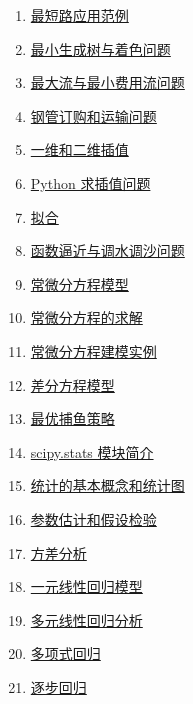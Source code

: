 \documentclass[11pt]{article}
\begin{document}
\begin{multicols}{2}
\begin{enumerate}
		\item \href{https://mp.weixin.qq.com/s/D-LwWOnp1dlR1xJcdK7jGw}{最短路应用范例}	%
		\item \href{https://mp.weixin.qq.com/s/gss20qLm8R40ghi8kswjDQ}{最小生成树与着色问题}	%
		\item \href{https://mp.weixin.qq.com/s/8_kQZ2zNd8E5o1i4J9A96g}{最大流与最小费用流问题}	%
		\item \href{https://mp.weixin.qq.com/s/4SFn62-Yr5spSnu1NDyyiw}{钢管订购和运输问题}	%
		\item \href{https://mp.weixin.qq.com/s/deuFdsP_lre19vbfrHLyuA}{一维和二维插值}	%
		\item \href{https://mp.weixin.qq.com/s/qr8_ELPp0CPPxQWQ1yDPcg}{Python 求插值问题}	%
		\item \href{https://mp.weixin.qq.com/s/W9iIVoX102xHHCMcYOHL-Q}{拟合}	%
		\item \href{https://mp.weixin.qq.com/s/kHHkfuYuxODWHGemBIlvlA}{函数逼近与调水调沙问题}	%
		\item \href{https://mp.weixin.qq.com/s/sp51TLQai2KqTYrb3awcVg}{常微分方程模型}	%
		\item \href{https://mp.weixin.qq.com/s/7K4-Oz19fJf0OOFyCTmTow}{常微分方程的求解}	%
		\item \href{https://mp.weixin.qq.com/s/6-KVS8nNr8kdSDCJK4RXCw}{常微分方程建模实例}	%
		\item \href{https://mp.weixin.qq.com/s/187nbFDvdoHGZP-_5tDMoQ}{差分方程模型}	%
		\item \href{https://mp.weixin.qq.com/s/rkrzHvlcDQnDGRY3BfI7EQ}{最优捕鱼策略}	%
		\item \href{https://mp.weixin.qq.com/s/uUuJ7Nq-kWLPycinsSRdPw}{scipy.stats 模块简介}	%
		\item \href{https://mp.weixin.qq.com/s/rn9Ji-J7kv5cPpPM9B-5UQ}{统计的基本概念和统计图}	%
		\item \href{https://mp.weixin.qq.com/s/VXDre3jwvwNpyQTyaoYd0g}{参数估计和假设检验}	%
		\item \href{https://mp.weixin.qq.com/s/bOR7qrVEItNixh2gdiKmQg}{方差分析}	%
		\item \href{https://mp.weixin.qq.com/s/If_OlQPtPL5la7Z-_AAhbA}{一元线性回归模型}	%
		\item \href{https://mp.weixin.qq.com/s/RYco1pLesTNgqXB8bP4SOA}{多元线性回归分析}	%
		\item \href{https://mp.weixin.qq.com/s/3S_9DnIeylNvIS1qPgROTw}{多项式回归}	%
		\item \href{https://mp.weixin.qq.com/s/F0L9tSw0mqh3jhx5nRXYMg}{逐步回归}	%

\end{enumerate}
\end{multicols}
\end{document}
